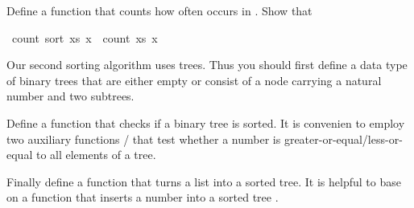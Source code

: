 \begin{isabellebody}
\begin{isamarkuptext}
Define a function  that counts how often 
occurs in . Show that%
\end{isamarkuptext}%
\isamarkuptrue%
\ {\isachardoublequote}count\ {\isacharparenleft}sort\ xs{\isacharparenright}\ x\ {\isacharequal}\ count\ xs\ x{\isachardoublequote}\isamarkupfalse%
\isamarkupfalse%
%
\isamarkuptrue%
%
\begin{isamarkuptext}%
Our second sorting algorithm uses trees. Thus you should first
define a data type  of binary trees that are either
empty or consist of a node carrying a natural number and two subtrees.

Define a function  that checks if a binary tree is
sorted. It is convenien to employ two auxiliary functions / that test whether a number is
greater-or-equal/less-or-equal to all elements of a tree.

Finally define a function  that turns a list into a
sorted tree. It is helpful to base  on a function
 that inserts a number  into a sorted tree
.


\end{isamarkuptext}
\end{isabellebody}
